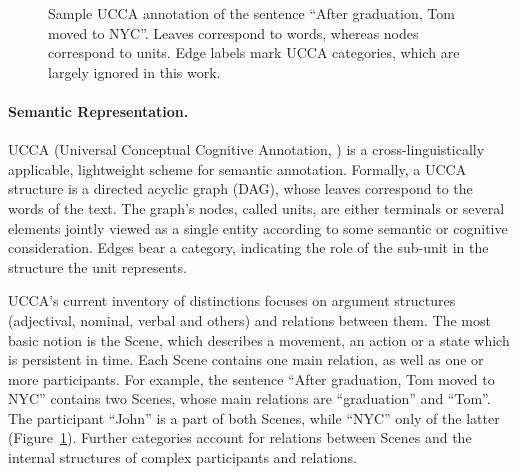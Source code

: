 \documentclass[11pt]{article}
\newcommand{\figref}[1]{Figure~\ref{#1}}
\def\inparcite#1{\newcite{#1}}
\begin{document}
\begin{figure}

\caption{\label{fig:ucca_example}
  Sample UCCA annotation of the sentence ``After graduation, Tom moved
  to NYC''. Leaves correspond to words, whereas nodes correspond to units.
  Edge labels mark UCCA categories, which are largely ignored in this work.}
\end{figure}




\paragraph{Semantic Representation.}
UCCA (Universal Conceptual Cognitive Annotation, \inparcite{abend2013universal}) is a
cross-linguistically applicable, lightweight
scheme for semantic annotation. Formally, a UCCA structure is a directed acyclic graph (DAG),
whose leaves correspond to the words of the text.
The graph's nodes, called {\sc units}, are either terminals or several elements jointly
viewed as a single entity according to some semantic or cognitive consideration. Edges bear
a category, indicating the role of the sub-unit in the structure the unit
represents.

UCCA's current inventory of distinctions focuses on argument structures
(adjectival, nominal, verbal and others) and relations between them.
The most basic notion is the Scene, which describes a movement, an
action or a state which is persistent in time. Each Scene contains one main relation, as well
as one or more participants. For example, the sentence ``After graduation, Tom moved to NYC''
contains two Scenes, whose main relations are ``graduation'' and ``Tom''.
The participant ``John'' is a part of both Scenes, while ``NYC'' only of the
latter (\figref{fig:ucca_example}). Further categories account for
relations between Scenes and the internal structures of complex participants and relations.
\end{document}
